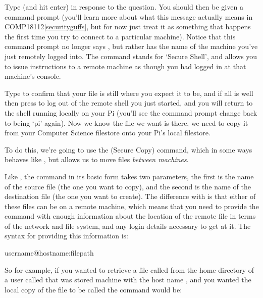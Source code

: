 Type  (and hit enter) in response to the question. You should then be given a command prompt (you'll learn more about what this message actually means in COMP18112\ref{securityguffs}, but for now just treat it as something that happens the first time you try to connect to a particular machine). Notice that this command prompt no longer says , but rather has the name of the machine you've just remotely logged into. The  command stands for `Secure Shell', and allows you to issue instructions to a remote machine as though you had logged in at that machine's console. 

Type  to confirm that your  file is still where you expect it to be, and if all is well then press  to log out of the remote shell you just started, and you will return to the shell running locally on your Pi (you'll see the command prompt change back to being `pi' again). Now we know the file we want is there, we need to copy it from your Computer Science filestore onto your Pi's local filestore.

To do this, we're going to use the  (Secure Copy) command, which in some ways behaves like , but allows us to move files \textit{between machines}. 

Like , the  command in its basic form takes two parameters, the first is the name of the source file (the one you want to copy), and the second is the name of the destination file (the one you want to create). The difference with  is that either of these files can be on a remote machine, which means that you need to provide the command with enough information about the location of the remote file in terms of the network and file system, and any login details necessary to get at it. The syntax for providing this information is:

\begin{ttoutenv}
username@hostname:filepath
\end{ttoutenv}

So for example, if you wanted to retrieve a file called  from the home directory of a user called  that was stored machine with the host name , and you wanted the local copy of the file to be called  the command would be:


